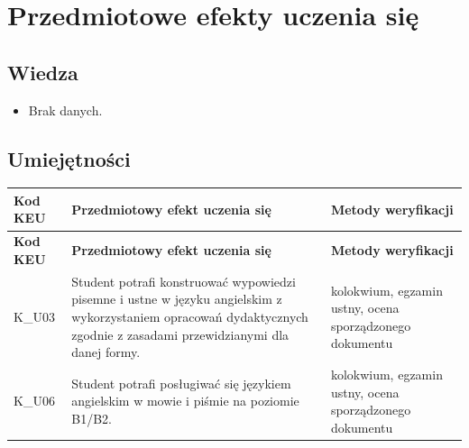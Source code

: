 \documentclass[12pt, a4paper]{article}
\newcommand{\thdrule}{\noalign{\global\setlength{\extrarowheight}{0pt}}}
\newcommand{\thdend}{\noalign{\global\setlength{\extrarowheight}{3pt}}}
\begin{document}
\section{Przedmiotowe efekty uczenia się}

\subsection*{Wiedza}
\begin{itemize}
  \item Brak danych.
\end{itemize}

\subsection*{Umiejętności}
{\scriptsize
\begin{longtable}{m{1.6cm}m{9.0cm}m{4.2cm}}
\thdrule\toprule
\rowcolor{pjatkRed} {\color{white}\footnotesize\textbf{\vphantom{Ag}Kod KEU}} & {\color{white}\footnotesize\textbf{\vphantom{Ag}Przedmiotowy efekt uczenia się}} & {\color{white}\footnotesize\textbf{\vphantom{Ag}Metody weryfikacji}} \\
\midrule\thdend
\endfirsthead
\thdrule\toprule
\rowcolor{pjatkRed} {\color{white}\footnotesize\textbf{\vphantom{Ag}Kod KEU}} & {\color{white}\footnotesize\textbf{\vphantom{Ag}Przedmiotowy efekt uczenia się}} & {\color{white}\footnotesize\textbf{\vphantom{Ag}Metody weryfikacji}} \\
\midrule\thdend
\endhead
  \rowcolor{tableRowLight} K\_U03 & Student potrafi konstruować wypowiedzi pisemne i ustne w języku angielskim z wykorzystaniem opracowań dydaktycznych zgodnie z zasadami przewidzianymi dla danej formy. & kolokwium, egzamin ustny, ocena sporządzonego dokumentu \\
  \rowcolor{tableRowAlt} K\_U06 & Student potrafi posługiwać się językiem angielskim w mowie i piśmie na poziomie B1/B2. & kolokwium, egzamin ustny, ocena sporządzonego dokumentu \\
\bottomrule
\end{longtable}}
\end{document}

